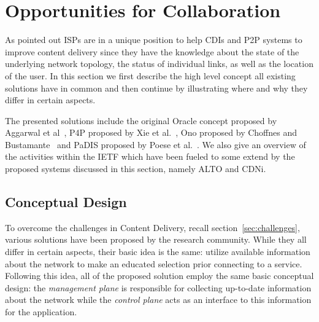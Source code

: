 \section{Opportunities for Collaboration}\label{sec:Opportunities}

As pointed out ISPs are in a unique position to help CDIs and P2P systems to
improve content delivery since they have the knowledge about the state of the
underlying network topology, the status of individual links, as well as the
location of the user. In this section we first describe the high level concept
all existing solutions have in common and then continue by illustrating where
and why they differ in certain aspects.

The presented solutions include the original Oracle concept proposed by
Aggarwal et al~\cite{afs-cispp2pcip-ccr07}, P4P proposed by Xie et al.~\cite{p4p},
Ono proposed by Choffnes and Bustamante~\cite{taming} and PaDIS proposed by Poese
et al.~\cite{PaDIS-IC}. We also give an overview of the activities within the
IETF which have been fueled to some extend by the proposed systems discussed in
this section, namely ALTO and CDNi.

\subsection{Conceptual Design}\label{sec:Concept-Opportunties-Collaboration}

To overcome the challenges in Content Delivery, recall
section~\ref{sec:challenges}, various solutions have been proposed by the
research community. While they all differ in certain aspects, their basic idea
is the same: utilize available information about the network to make an
educated selection prior connecting to a service.  Following this idea, all of
the proposed solution employ the same basic conceptual design: the
\emph{management plane} is responsible for collecting up-to-date information
about the network while the \emph{control plane} acts as an interface to this
information for the application.\\


